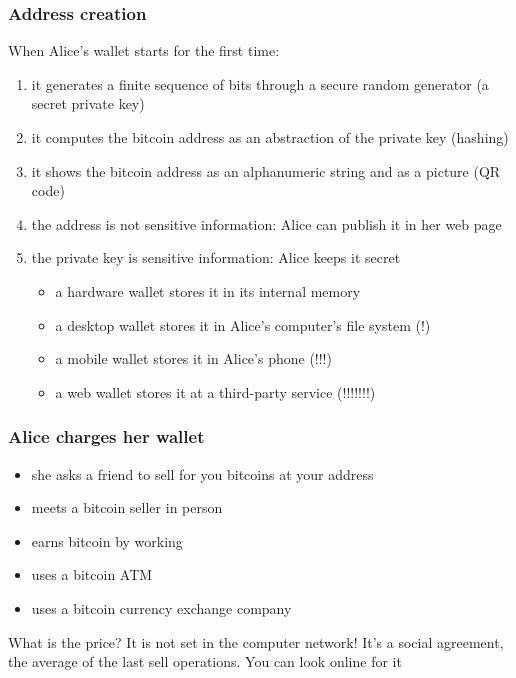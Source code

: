 \documentclass[11pt]{beamer}  %
\begin{document}
\begin{frame}\frametitle{Address creation}

  When Alice's wallet starts for the first time:

  \begin{enumerate}
  \item it generates a finite sequence of bits through a secure random generator
    (a secret private key)
  \item it computes the bitcoin address as an abstraction of the private key
    (hashing)
  \item it shows the bitcoin address as an alphanumeric string and as a picture (QR code)
  \item \alert{the address is not sensitive information}: Alice can publish it in her web page
  \item \alert{the private key is sensitive information}: Alice keeps it secret
    \begin{itemize}
    \item a hardware wallet stores it in its internal memory
    \item a desktop wallet stores it in Alice's computer's file system (!)
    \item a mobile wallet stores it in Alice's phone (!!!)
    \item a web wallet stores it at a third-party service (!!!!!!!)
    \end{itemize}
  \end{enumerate}
\end{frame}

\begin{frame}\frametitle{Alice charges her wallet}
  \begin{itemize}
  \item she asks a friend to sell for you bitcoins at your address
  \item meets a bitcoin seller in person
  \item earns bitcoin by working
  \item uses a bitcoin ATM
  \item uses a bitcoin currency exchange company
  \end{itemize}

  \bigskip

  \begin{greenbox}{What is the price?}
    It is not set in the computer network! It's a social
    agreement, the average of the last sell operations.
    You can look online for it
  \end{greenbox}

\end{frame}
\end{document}
